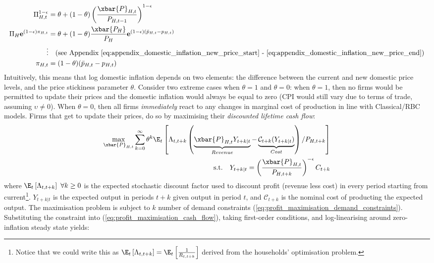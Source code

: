 \begin{align}
    \Pi_{H,t}^{1-\epsilon} &= \theta + (1-\theta)\left(\frac{\xbar{P}_{H,t}}{P_{H,t-1}}\right)^{1-\epsilon} \\
    \Pi_H \mathbf{e}^{(1-\epsilon)\pi_{H,t}} &= \theta + (1-\theta)\frac{\xbar{P_H}}{P_H}\mathbf{e}^{(1-\epsilon)(\bar{p}_{H,t} - p_{H,t})} \\
    \vdots & \quad \text{(see Appendix \ref{eq:appendix_domestic_inflation_new_price_start} - \ref{eq:appendix_domestic_inflation_new_price_end})} \nonumber \\
    \pi_{H,t} &= (1-\theta)(\bar{p}_{H,t} - p_{H,t}) \label{eq:domestic_inflation_new_price_relationship}
\end{align}
Intuitively, this means that log domestic inflation depends on two elements: the difference between the current and new domestic price levels, and the price stickiness parameter $\theta$. Consider two extreme cases when $\theta = 1$ and $\theta = 0$: when $\theta = 1$, then no firms would be permitted to update their prices and the domestic inflation would always be equal to zero (CPI would still vary due to terms of trade, assuming $\upsilon \ne 0$). When $\theta = 0$, then all firms \textit{immediately} react to any changes in marginal cost of production in line with Classical/RBC models. Firms that get to update their prices, do so by maximising their \textit{discounted lifetime cash flow}:
\begin{align}
    \max_{\xbar{P}_{H,t}} \sum_{k=0}^{\infty} \theta^k \E_t \left[\Lambda_{t,t+k} \left( \underbrace{\xbar{P}_{H,t} Y_{t+k|t}}_{Revenue} - \underbrace{\mathcal{C}_{t+k}(Y_{t+k|t})}_{Cost} \right) / P_{H,t+k} \right] \label{eq:profit_maximisation_cash_flow}\\
    \text{s.t.} \quad Y_{t+k|t} = \left(\frac{\xbar{P}_{H,t}}{P_{H,t+k}}\right)^{-\epsilon} C_{t+k} \label{eq:profit_maximisation_demand_constraints}
\end{align}
where $\E_t \left[\Lambda_{t,t+k}\right]\ \forall k \geq 0$ is the expected stochastic discount factor used to discount profit (revenue less cost) in every period starting from current\footnote{Notice that we could write this as $\E_t \left[\Lambda_{t,t+k}\right]=\E_t \left[\frac{1}{R_{t, t+k}}\right]$ derived from the households' optimisation problem.}. $Y_{t+k|t}$ is the expected output in periods $t+k$ given output in period $t$, and $\mathcal{C}_{t+k}$ is the nominal cost of producting the expected output. The maximisation problem is subject to $k$ number of demand constraints (\ref{eq:profit_maximisation_demand_constraints}). Substituting the constraint into (\ref{eq:profit_maximisation_cash_flow}), taking first-order conditions, and log-linearising around zero-inflation steady state yields:
